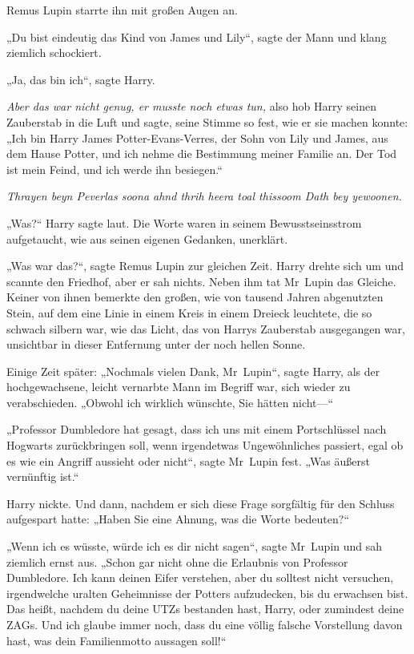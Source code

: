 {Remus Lupin starrte ihn mit großen Augen an.

„Du bist eindeutig das Kind von James und Lily“, sagte der Mann und klang ziemlich schockiert.

„Ja, das bin ich“, sagte Harry.

\emph{Aber das war nicht genug, er musste noch etwas tun,} also hob Harry seinen Zauberstab in die Luft und sagte, seine Stimme so fest, wie er sie machen konnte: „Ich bin Harry James Potter-Evans-Verres, der Sohn von Lily und James, aus dem Hause Potter, und ich nehme die Bestimmung meiner Familie an. Der Tod ist mein Feind, und ich werde ihn besiegen.“

\emph{Thrayen beyn Peverlas soona ahnd thrih heera toal thissoom Dath bey yewoonen.}

„Was?“ Harry sagte laut. Die Worte waren in seinem Bewusstseinsstrom aufgetaucht, wie aus seinen eigenen Gedanken, unerklärt.

„Was war das?“, sagte Remus Lupin zur gleichen Zeit. Harry drehte sich um und scannte den Friedhof, aber er sah nichts. Neben ihm tat Mr~Lupin das Gleiche. Keiner von ihnen bemerkte den großen, wie von tausend Jahren abgenutzten Stein, auf dem eine Linie in einem Kreis in einem Dreieck leuchtete, die so schwach silbern war, wie das Licht, das von Harrys Zauberstab ausgegangen war, unsichtbar in dieser Entfernung unter der noch hellen Sonne.

Einige Zeit später: „Nochmals vielen Dank, Mr~Lupin“, sagte Harry, als der hochgewachsene, leicht vernarbte Mann im Begriff war, sich wieder zu verabschieden. „Obwohl ich wirklich wünschte, Sie hätten nicht—“

„Professor Dumbledore hat gesagt, dass ich uns mit einem Portschlüssel nach Hogwarts zurückbringen soll, wenn irgendetwas Ungewöhnliches passiert, egal ob es wie ein Angriff aussieht oder nicht“, sagte Mr~Lupin fest. „Was äußerst vernünftig ist.“

Harry nickte. Und dann, nachdem er sich diese Frage sorgfältig für den Schluss aufgespart hatte: „Haben Sie eine Ahnung, was die Worte bedeuten?“

„Wenn ich es wüsste, würde ich es dir nicht sagen“, sagte Mr~Lupin und sah ziemlich ernst aus. „Schon gar nicht ohne die Erlaubnis von Professor Dumbledore. Ich kann deinen Eifer verstehen, aber du solltest nicht versuchen, irgendwelche uralten Geheimnisse der Potters aufzudecken, bis du erwachsen bist. Das heißt, nachdem du deine UTZs bestanden hast, Harry, oder zumindest deine ZAGs. Und ich glaube immer noch, dass du eine völlig falsche Vorstellung davon hast, was dein Familienmotto aussagen soll!“

}
